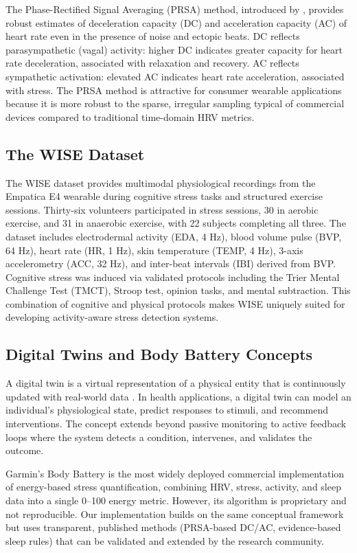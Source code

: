 \documentclass[12pt,letterpaper]{article}
\begin{document}
The Phase-Rectified Signal Averaging (PRSA) method, introduced by \cite{bauer2006prsa}, provides robust estimates of deceleration capacity (DC) and acceleration capacity (AC) of heart rate even in the presence of noise and ectopic beats. DC reflects parasympathetic (vagal) activity: higher DC indicates greater capacity for heart rate deceleration, associated with relaxation and recovery. AC reflects sympathetic activation: elevated AC indicates heart rate acceleration, associated with stress. The PRSA method is attractive for consumer wearable applications because it is more robust to the sparse, irregular sampling typical of commercial devices compared to traditional time-domain HRV metrics.

\subsection{The WISE Dataset}

The WISE dataset \citep{schlink2020wise} provides multimodal physiological recordings from the Empatica E4 wearable during cognitive stress tasks and structured exercise sessions. Thirty-six volunteers participated in stress sessions, 30 in aerobic exercise, and 31 in anaerobic exercise, with 22 subjects completing all three. The dataset includes electrodermal activity (EDA, 4 Hz), blood volume pulse (BVP, 64 Hz), heart rate (HR, 1 Hz), skin temperature (TEMP, 4 Hz), 3-axis accelerometry (ACC, 32 Hz), and inter-beat intervals (IBI) derived from BVP. Cognitive stress was induced via validated protocols including the Trier Mental Challenge Test (TMCT), Stroop test, opinion tasks, and mental subtraction. This combination of cognitive and physical protocols makes WISE uniquely suited for developing activity-aware stress detection systems.

\subsection{Digital Twins and Body Battery Concepts}

A digital twin is a virtual representation of a physical entity that is continuously updated with real-world data \citep{barricelli2019digital}. In health applications, a digital twin can model an individual's physiological state, predict responses to stimuli, and recommend interventions. The concept extends beyond passive monitoring to active feedback loops where the system detects a condition, intervenes, and validates the outcome.

Garmin's Body Battery \citep{garmin2024bodybattery} is the most widely deployed commercial implementation of energy-based stress quantification, combining HRV, stress, activity, and sleep data into a single 0--100 energy metric. However, its algorithm is proprietary and not reproducible. Our implementation builds on the same conceptual framework but uses transparent, published methods (PRSA-based DC/AC, evidence-based sleep rules) that can be validated and extended by the research community.
\end{document}
